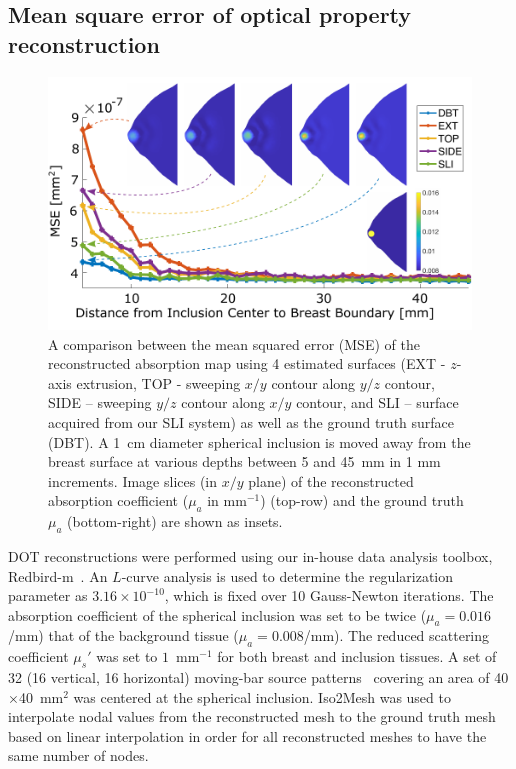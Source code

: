 \subsection{Mean square error of optical property reconstruction}
\begin{figure}
	\begin{center}
	    \includegraphics[width=.9\textwidth]{fig/omci/mse.pdf}
	\end{center}
	\caption{A comparison between the mean squared error (MSE) of the reconstructed absorption map using 4 estimated surfaces (EXT - $z$-axis extrusion, TOP - sweeping $x/y$ contour along $y/z$ contour, SIDE -- sweeping $y/z$ contour along $x/y$ contour, and SLI -- surface acquired from our SLI system) as well as the ground truth surface (DBT). A 1~cm diameter spherical inclusion is moved away from the breast surface at various depths between 5 and 45~mm in 1 mm increments. Image slices (in $x/y$ plane) of the reconstructed absorption coefficient ($\mu_a$ in mm$^{-1}$) (top-row) and the ground truth $\mu_a$ (bottom-right) are shown as insets.}
	\label{fig:mse}
\end{figure} 

DOT reconstructions were performed using our in-house data analysis toolbox, Redbird-m~\cite{Redbird2008}. An $L$-curve analysis is used to determine the regularization parameter as $3.16\times 10^{-10}$, which is fixed over 10 Gauss-Newton iterations. The absorption coefficient of the spherical inclusion was set to be twice ($\mu_a=0.016$/mm) that of the background tissue ($\mu_a=0.008$/mm). The reduced scattering coefficient $\mu_s'$ was set to $1$~mm$^{-1}$ for both breast and inclusion tissues. A set of 32 (16 vertical, 16 horizontal) moving-bar source patterns~\cite{Yao2015} covering an area of 40$\times$40~mm$^2$ was centered at the spherical inclusion. Iso2Mesh was used to interpolate nodal values from the reconstructed mesh to the ground truth mesh based on linear interpolation in order for all reconstructed meshes to have the same number of nodes.

